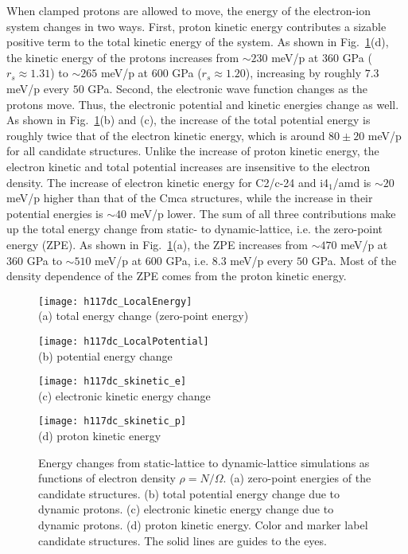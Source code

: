 When clamped protons are allowed to move, the energy of the electron-ion system changes in two ways.
First, proton kinetic energy contributes a sizable positive term to the total kinetic energy of the system. As shown in Fig.~\ref{fig:hsolid-ion-energy}(d), the kinetic energy of the protons increases from $\sim 230$ meV/p at $360$ GPa ($r_s\approx 1.31$) to $\sim 265$ meV/p at $600$ GPa ($r_s\approx 1.20$), increasing by roughly $7.3$ meV/p every $50$ GPa.
Second, the electronic wave function changes as the protons move. Thus, the electronic potential and kinetic energies change as well.
As shown in Fig.~\ref{fig:hsolid-ion-energy}(b) and (c), the increase of the total potential energy is roughly twice that of the electron kinetic energy, which is around $80\pm20$ meV/p for all candidate structures.
Unlike the increase of proton kinetic energy, the electron kinetic and total potential increases are insensitive to the electron density.
The increase of electron kinetic energy for C2/c-24 and i4$_1$/amd is $\sim 20$ meV/p higher than that of the Cmca structures, while the increase in their potential energies is $\sim 40$ meV/p lower.
The sum of all three contributions make up the total energy change from static- to dynamic-lattice, i.e. the zero-point energy (ZPE).
As shown in Fig.~\ref{fig:hsolid-ion-energy}(a), the ZPE increases from $\sim 470$ meV/p at $360$ GPa to $\sim 510$ meV/p at $600$ GPa, i.e. $8.3$ meV/p every $50$ GPa.
Most of the density dependence of the ZPE comes from the proton kinetic energy.

\begin{figure}[h]
	\centering
	\begin{minipage}{0.49\textwidth}
		\centering
		\texttt{[image: h117dc\_LocalEnergy]}\\
		(a) total energy change (zero-point energy)
	\end{minipage}
	\begin{minipage}{0.49\textwidth}
		\centering
		\texttt{[image: h117dc\_LocalPotential]}\\
		(b) potential energy change
	\end{minipage}
	\begin{minipage}{0.49\textwidth}
		\centering
		\texttt{[image: h117dc\_skinetic\_e]}\\
		(c) electronic kinetic energy change
	\end{minipage}
	\begin{minipage}{0.49\textwidth}
		\centering
		\texttt{[image: h117dc\_skinetic\_p]}\\
		(d) proton kinetic energy
	\end{minipage}
	\caption{Energy changes from static-lattice to dynamic-lattice simulations as functions of electron density $\rho=N/\Omega$. (a) zero-point energies of the candidate structures. (b) total potential energy change due to dynamic protons. (c) electronic kinetic energy change due to dynamic protons. (d) proton kinetic energy. Color and marker label candidate structures. The solid lines are guides to the eyes.}
	\label{fig:hsolid-ion-energy}
\end{figure}

